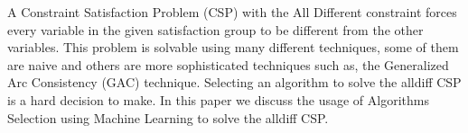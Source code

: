 A Constraint Satisfaction Problem (CSP) with the All Different constraint forces every variable in the given satisfaction group to be different from the other variables. This problem is solvable using many different techniques, some of them are naive and others are more sophisticated techniques such as, the Generalized Arc Consistency (GAC) technique. Selecting an algorithm to solve the alldiff CSP is a hard decision to make. In this paper we discuss the usage of Algorithms Selection using Machine Learning to solve the alldiff CSP.

